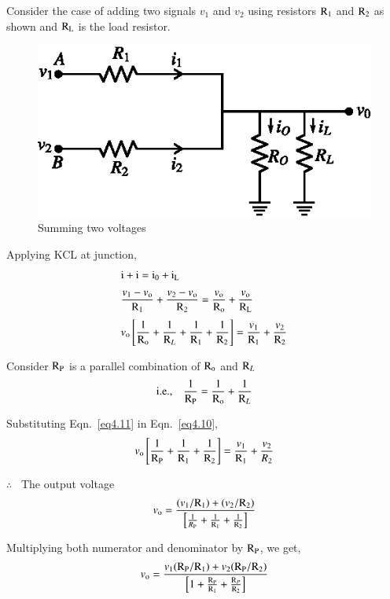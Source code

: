 Consider the case of adding two signals $v_{1}$ and $v_{2}$ using resistors $\textrm{R}_{1}$ and $\textrm{R}_{2}$ as shown and $\textrm{R}_{\textrm{L}}$ is the load resistor.
\begin{figure}[H]
\centering
\includegraphics{chap4/fig4.6.eps}
\caption{Summing two voltages}\label{fig4.6}
\end{figure}

Applying KCL at junction,
\begin{align}
& \textrm{i} +\textrm{i}=\textrm{i}_{0}+\textrm{i}_{\textrm{L}}\label{eq4.9}\\[3pt]
& \frac{v_{1}-v_{\textrm{o}}}{\textrm{R}_{1}}+\frac{v_{2}-v_{\textrm{o}}}{\textrm{R}_{2}}=\frac{v_{\textrm{o}}}{\textrm{R}_{\textrm{o}}}+\frac{v_{\textrm{o}}}{\textrm{R}_{\textrm{L}}}\notag\\[3pt]
& v_{\textrm{o}}\left[\frac{1}{\textrm{R}_{\textrm{o}}}+\frac{1}{\textrm{R}_{L}}+\frac{1}{\textrm{R}_{1}}+\frac{1}{\textrm{R}_{2}}\right]=\frac{v_{1}}{\textrm{R}_{1}}+\frac{v_{2}}{\textrm{R}_{2}}\label{eq4.10}
\end{align}

Consider $\textrm{R}_{\textrm{P}}$ is a parallel combination of $\textrm{R}_{\textrm{o}}$ and $\textrm{R}_{L}$
\begin{equation}
\text{i.e.,}\quad \frac{1}{\textrm{R}_{\textrm{P}}}=\frac{1}{\textrm{R}_{\textrm{o}}}+\frac{1}{\textrm{R}_{L}}\label{eq4.11}
\end{equation}

Substituting Eqn.~\eqref{eq4.11} in Eqn.~\eqref{eq4.10},
$$
v_{\textrm{o}}\left[\frac{1}{\textrm{R}_{\textrm{P}}}+\frac{1}{\textrm{R}_{1}}+\frac{1}{\textrm{R}_{2}}\right]=\frac{v_{1}}{\textrm{R}_{1}}+\frac{v_{2}}{R_{2}}
$$

$\therefore$~ The output voltage
\begin{equation}
v_{\textrm{o}}=\frac{(v_{1}/\textrm{R}_{1})+(v_{2}/\textrm{R}_{2})}{\left[\frac{1}{R_{\textrm{P}}}+\frac{1}{\textrm{R}_{1}}+\frac{1}{\textrm{R}_{2}}\right]}\label{eq4.12}
\end{equation}

Multiplying both numerator and denominator by $\textrm{R}_{\textrm{P}}$, we get,
\begin{equation}
v_{\textrm{o}}=\frac{v_{1}(\textrm{R}_{\textrm{P}}/\textrm{R}_{1})+v_{2}(\textrm{R}_{\textrm{P}}/\textrm{R}_{2})}{\left[1+\frac{\textrm{R}_{\textrm{P}}}{\textrm{R}_{1}}+\frac{\textrm{R}_{P}}{\textrm{R}_{2}}\right]}\label{eq4.13}
\end{equation}

